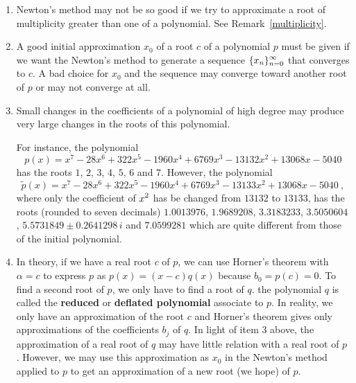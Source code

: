 \begin{rmkList}
\begin{enumerate}
\item Newton's method may not be so good if we try to
approximate a root of multiplicity greater than one of a polynomial.
See Remark~\ref{multiplicity}.
\item A good initial approximation $x_0$ of a root $c$ of a polynomial
$p$ must be given if we want the Newton's method to generate a
sequence $\displaystyle \{x_n\}_{n=0}^\infty$ that converges to $c$.
A bad choice for
$x_0$ and the sequence may converge toward another root of $p$ or may
not converge at all.
\item Small changes in the coefficients of a polynomial of high degree
may produce very large changes in the roots of this polynomial.

For instance, the polynomial
\[
p(x) = x^7 - 28x^6 +322x^5 - 1960x^4 + 6769x^3
- 13132x^2 +13068x - 5040
\]
has the roots $1$, $2$, $3$, $4$, $5$, $6$ and $7$.  However, the
polynomial
\[
\tilde{p}(x) = x^7 - 28x^6 +322x^5 -1960x^4 + 6769x^3
-13133x^2 +13068x -5040 \ ,
\]
where only the coefficient of $\displaystyle x^2$ has be changed from
$13132$ to $13133$, has the roots (rounded to seven decimals) $1.0013976$,
$1.9689208$, $3.3183233$, $3.5050604$, $5.5731849 \pm 0.2641298\, i$
and $7.0599281$ which are quite different from those of the initial
polynomial.
\item In theory, if we have a real root $c$ of $p$, we can use Horner's
theorem with $\alpha = c$ to express $p$ as $p(x) = (x-c)q(x)$
because $b_0 = p(c) = 0$.  To find a second root of $p$, we only have to
find a root of $q$.  the polynomial $q$ is called the
{\bfseries reduced} or
{\bfseries deflated polynomial} associate to
$p$.  In reality, we only have an approximation of the root $c$ and
Horner's theorem gives only approximations of the coefficients $b_j$
of $q$.  In light of item 3 above, the approximation of a real root of
$q$ may have little relation with a real root of $p$.  However, we may
use this approximation as $x_0$ in the Newton's method applied to
$p$ to get an approximation of a new root (we hope) of $p$.
\end{enumerate}
\end{rmkList}

